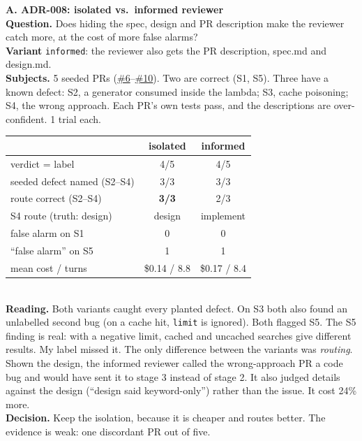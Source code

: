 \documentclass[11pt,a4paper]{article}
\newcommand{\gh}[1]{\href{https://github.com/iDheer/tinydb/#1}}
\begin{document}
\noindent
\begin{minipage}[t]{0.488\textwidth}
\textbf{A. ADR-008: isolated vs.\ informed reviewer}\\[2pt]
\small
\textbf{Question.} Does hiding the spec, design and PR description make the reviewer catch more,
at the cost of more false alarms?\\
\textbf{Variant} \texttt{informed}: the reviewer also gets the PR description, spec.md and design.md.\\
\textbf{Subjects.} 5 seeded PRs (\gh{pull/6}{\#6}--\gh{pull/10}{\#10}). Two are correct (S1, S5).
Three have a known defect: S2, a generator consumed inside the lambda; S3, cache poisoning; S4, the
wrong approach. Each PR's own tests pass, and the descriptions are over-confident. 1 trial each.\\[3pt]
\scriptsize
\begin{tabular}{@{}lcc@{}}
\toprule
 & isolated & informed \\
\midrule
verdict = label & 4/5 & 4/5 \\
seeded defect named (S2--S4) & 3/3 & 3/3 \\
route correct (S2--S4) & \textbf{3/3} & 2/3 \\
S4 route (truth: design) & design & implement \\
false alarm on S1 & 0 & 0 \\
``false alarm'' on S5 & 1 & 1 \\
mean cost / turns & \$0.14 / 8.8 & \$0.17 / 8.4 \\
\bottomrule
\end{tabular}\\[3pt]
\small
\textbf{Reading.} Both variants caught every planted defect. On S3 both also found an unlabelled
second bug (on a cache hit, \texttt{limit} is ignored). Both flagged S5. The S5 finding is real:
with a negative limit, cached and uncached searches give different results. My label missed it.
The only difference between the variants was \emph{routing}. Shown the design, the informed
reviewer called the wrong-approach PR a code bug and would have sent it to stage 3 instead of
stage 2. It also judged details against the design (``design said keyword-only'') rather than the
issue. It cost 24\% more.\\
\textbf{Decision.} Keep the isolation, because it is cheaper and routes better. The evidence is
weak: one discordant PR out of five.
\end{minipage}\hfill
\end{document}
